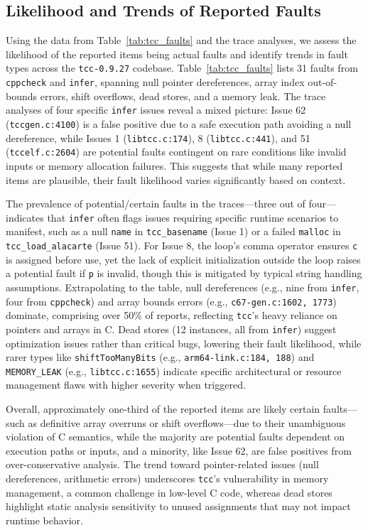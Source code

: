 \documentclass[conference]{IEEEtran}
\begin{document}
\subsection{Likelihood and Trends of Reported Faults}
Using the data from Table~\ref{tab:tcc_faults} and the trace analyses, we assess the likelihood of the reported items being actual faults and identify trends in fault types across the \texttt{tcc-0.9.27} codebase. Table~\ref{tab:tcc_faults} lists 31 faults from \texttt{cppcheck} and \texttt{infer}, spanning null pointer dereferences, array index out-of-bounds errors, shift overflows, dead stores, and a memory leak. The trace analyses of four specific \texttt{infer} issues reveal a mixed picture: Issue 62 (\texttt{tccgen.c:4100}) is a false positive due to a safe execution path avoiding a null dereference, while Issues 1 (\texttt{libtcc.c:174}), 8 (\texttt{libtcc.c:441}), and 51 (\texttt{tccelf.c:2604}) are potential faults contingent on rare conditions like invalid inputs or memory allocation failures. This suggests that while many reported items are plausible, their fault likelihood varies significantly based on context.

The prevalence of potential/certain faults in the traces—three out of four—indicates that \texttt{infer} often flags issues requiring specific runtime scenarios to manifest, such as a null \texttt{name} in \texttt{tcc\_basename} (Issue 1) or a failed \texttt{malloc} in \texttt{tcc\_load\_alacarte} (Issue 51). For Issue 8, the loop’s comma operator ensures \texttt{c} is assigned before use, yet the lack of explicit initialization outside the loop raises a potential fault if \texttt{p} is invalid, though this is mitigated by typical string handling assumptions. Extrapolating to the table, null dereferences (e.g., nine from \texttt{infer}, four from \texttt{cppcheck}) and array bounds errors (e.g., \texttt{c67-gen.c:1602, 1773}) dominate, comprising over 50\% of reports, reflecting \texttt{tcc}’s heavy reliance on pointers and arrays in C. Dead stores (12 instances, all from \texttt{infer}) suggest optimization issues rather than critical bugs, lowering their fault likelihood, while rarer types like \texttt{shiftTooManyBits} (e.g., \texttt{arm64-link.c:184, 188}) and \texttt{MEMORY\_LEAK} (e.g., \texttt{libtcc.c:1655}) indicate specific architectural or resource management flaws with higher severity when triggered.

Overall, approximately one-third of the reported items are likely certain faults—such as definitive array overruns or shift overflows—due to their unambiguous violation of C semantics, while the majority are potential faults dependent on execution paths or inputs, and a minority, like Issue 62, are false positives from over-conservative analysis. The trend toward pointer-related issues (null dereferences, arithmetic errors) underscores \texttt{tcc}’s vulnerability in memory management, a common challenge in low-level C code, whereas dead stores highlight static analysis sensitivity to unused assignments that may not impact runtime behavior.
\end{document}
